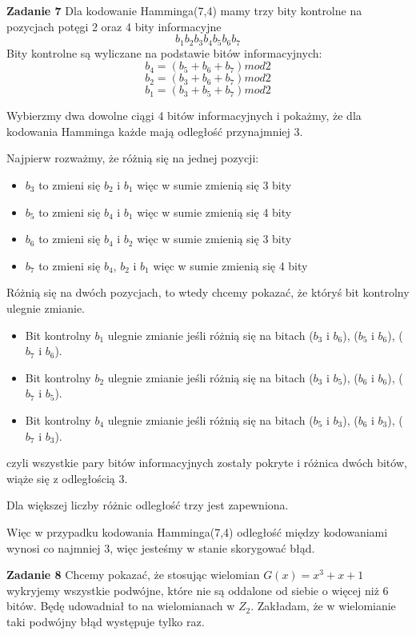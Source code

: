 \documentclass[12pt,a4paper]{article}
\newcommand{\zadanie}[1]{\par\textbf{Zadanie #1}}
\begin{document}
\zadanie{7}
Dla kodowanie Hamminga(7,4) mamy trzy bity kontrolne na pozycjach potęgi 2 oraz 4 bity informacyjne $$b_{1}b_{2}b_{3}b_{4}b_{5}b_{6}b_{7}$$
Bity kontrolne są wyliczane na podstawie bitów informacyjnych:
$$b_{4} = (b_{5} + b_{6} + b_{7}) mod 2$$
$$b_{2} = (b_{3} + b_{6} + b_{7}) mod 2$$
$$b_{1} = (b_{3} + b_{5} + b_{7}) mod 2$$

Wybierzmy dwa dowolne ciągi 4 bitów informacyjnych i pokażmy, że dla kodowania Hamminga każde mają odległość przynajmniej 3.

Najpierw rozważmy, że różnią się na jednej pozycji:
\begin{itemize}
\item $b_{3}$ to zmieni się $b_{2}$ i $b_{1}$ więc w sumie zmienią się 3 bity
\item $b_{5}$ to zmieni się $b_{4}$ i $b_{1}$ więc w sumie zmienią się 4 bity
\item $b_{6}$ to zmieni się $b_{4}$ i $b_{2}$ więc w sumie zmienią się 3 bity
\item $b_{7}$ to zmieni się $b_{4}$, $b_{2}$ i $b_{1}$ więc w sumie zmienią się 4 bity
\end{itemize}

Różnią się na dwóch pozycjach, to wtedy chcemy pokazać, że któryś bit kontrolny ulegnie zmianie.

\begin{itemize}
\item Bit kontrolny $b_{1}$ ulegnie zmianie jeśli różnią się na bitach ($b_3$ i $b_6$), ($b_5$ i $b_6$), ($b_7$ i $b_6$).
\item Bit kontrolny $b_{2}$ ulegnie zmianie jeśli różnią się na bitach ($b_3$ i $b_5$), ($b_6$ i $b_6$), ($b_7$ i $b_5$).
\item Bit kontrolny $b_{4}$ ulegnie zmianie jeśli różnią się na bitach ($b_5$ i $b_3$), ($b_6$ i $b_3$), ($b_7$ i $b_3$).
\end{itemize}
czyli wszystkie pary bitów informacyjnych zostały pokryte i różnica dwóch bitów, wiąże się z odległością 3.

Dla większej liczby różnic odległość trzy jest zapewniona.

Więc w przypadku kodowania Hamminga(7,4) odległość między kodowaniami wynosi co najmniej 3, więc jesteśmy w stanie skorygować błąd.
\zadanie{8}
Chcemy pokazać, że stosując wielomian $G(x) = x^3+x+1$ wykryjemy wszystkie podwójne, które nie są oddalone od siebie o więcej niż 6 bitów. Będę udowadniał to na wielomianach w $Z_2$. Zakładam, że w wielomianie taki podwójny błąd występuje tylko raz.
\end{document}
